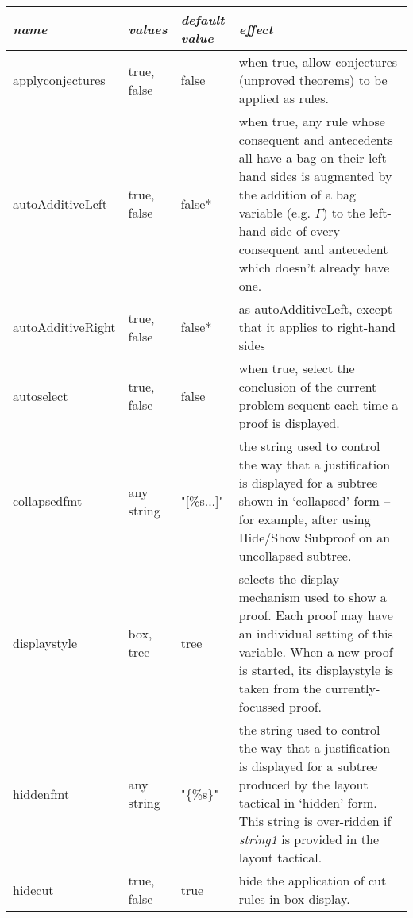 \documentclass[11pt]{book}
\begin{document}
\begin{tabular}{|p{1.034in}|p{0.635in}|p{0.717in}|p{2.114in}|} \hline
{\raggedright \textit{name}} & {\raggedright \textit{values}} & {\raggedright \textit{default value}} & {\raggedright \textit{effect}}\\
\hline
{\raggedright applyconjectures} & {\raggedright true, false} & {\raggedright false} & {\raggedright when true, allow conjectures (unproved theorems) to be applied as rules.}\\
\hline
{\raggedright autoAdditiveLeft} & {\raggedright true, false} & {\raggedright false*} & {\raggedright when true, any rule whose consequent and antecedents all have a bag on their left-hand sides is augmented by the addition of a bag variable (e.g. \ensuremath{\Gamma}) to the left-hand side of every consequent and antecedent which doesn't already have one.}\\
\hline
{\raggedright autoAdditiveRight} & {\raggedright true, false} & {\raggedright false*} & {\raggedright as autoAdditiveLeft, except that it applies to right-hand sides}\\
\hline
{\raggedright autoselect} & {\raggedright true, false} & {\raggedright false} & {\raggedright when true, select the conclusion of the current problem sequent each time a proof is displayed.}\\
\hline
{\raggedright collapsedfmt} & {\raggedright any string} & {\raggedright "[\%s...]"} & {\raggedright the string used to control the way that a justification is displayed for a subtree shown in `collapsed' form -- for example, after using Hide/Show Subproof on an uncollapsed subtree.}\\
\hline
{\raggedright displaystyle} & {\raggedright box, tree} & {\raggedright tree} & {\raggedright selects the display mechanism used to show a proof. Each proof may have an individual setting of this variable. When a new proof is started, its displaystyle is taken from the currently-focussed proof.}\\
\hline
{\raggedright hiddenfmt} & {\raggedright any string} & {\raggedright "\{\%s\}"} & {\raggedright the string used to control the way that a justification is displayed for a subtree produced by the layout tactical in `hidden' form. This string is over-ridden if \textit{string1} is provided in the layout tactical.}\\
\hline
{\raggedright hidecut} & {\raggedright true, false} & {\raggedright true} & {\raggedright hide the application of cut rules in box display.}\\

\end{tabular}
\end{document}

